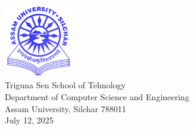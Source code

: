 \documentclass[10pt, oneside, article]{Thesis} %
\begin{document}
\begin{titlepage}
\begin{center}
{
\includegraphics[width=3cm]{Logo.png} \\%
Triguna Sen School of Tehnology\\ 
Department of Computer Science and Engineering\\ %
Assam University, Silchar 788011 \\
\large July 12, 2025}\\[1cm]%
\end{center}

\end{titlepage}
\end{document}
